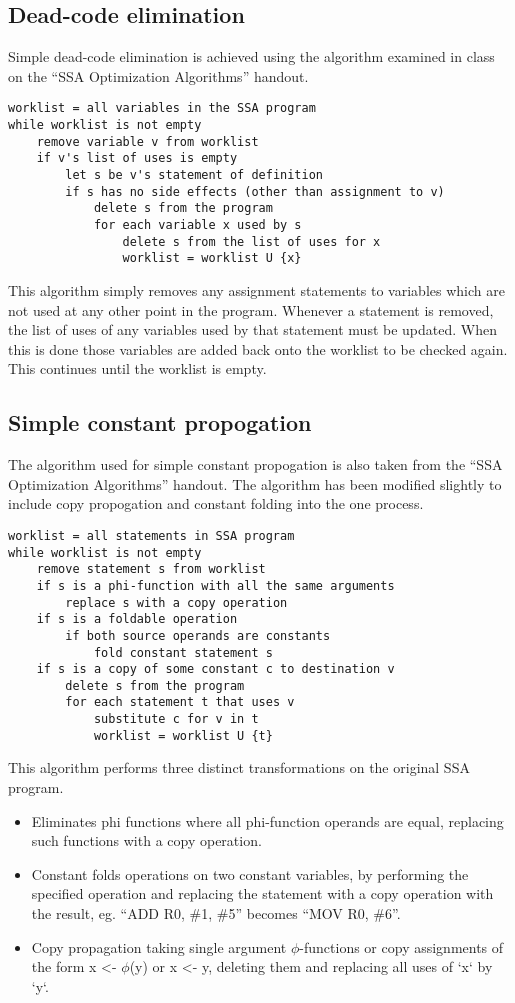 \documentclass[a4paper,10pt]{report}
\begin{document}
\subsection{Dead-code elimination}
Simple dead-code elimination is achieved using the algorithm examined in class on the ``SSA Optimization Algorithms'' handout.

\begin{verbatim}
worklist = all variables in the SSA program
while worklist is not empty
    remove variable v from worklist
    if v's list of uses is empty
        let s be v's statement of definition
        if s has no side effects (other than assignment to v)
            delete s from the program
            for each variable x used by s
                delete s from the list of uses for x
                worklist = worklist U {x}
\end{verbatim}
This algorithm simply removes any assignment statements to variables which are not used at any other point in the program.
Whenever a statement is removed, the list of uses of any variables used by that statement must be updated. When this is done
those variables are added back onto the worklist to be checked again. This continues until the worklist is empty.

\subsection{Simple constant propogation}
The algorithm used for simple constant propogation is also taken from the ``SSA Optimization Algorithms'' handout.
The algorithm has been modified slightly to include copy propogation and constant folding into the one process.

\begin{verbatim}
worklist = all statements in SSA program
while worklist is not empty
    remove statement s from worklist
    if s is a phi-function with all the same arguments
        replace s with a copy operation
    if s is a foldable operation
        if both source operands are constants
            fold constant statement s
    if s is a copy of some constant c to destination v
        delete s from the program
        for each statement t that uses v
            substitute c for v in t
            worklist = worklist U {t}
\end{verbatim}
This algorithm performs three distinct transformations on the original SSA program.
\begin{itemize}
 \item Eliminates phi functions where all phi-function operands are equal, replacing such functions with a copy operation.
 \item Constant folds operations on two constant variables, by performing the specified operation and replacing the statement
        with a copy operation with the result, eg. ``ADD R0, \#1, \#5'' becomes ``MOV R0, \#6''.
 \item Copy propagation taking single argument \(\phi\)-functions or copy assignments of the form x <- \(\phi\)(y) or x <- y, 
        deleting them and replacing all uses of `x` by `y`.
\end{itemize}
\end{document}
